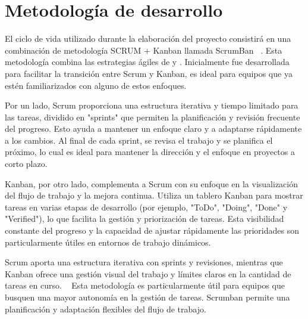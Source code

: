 \section{Metodología de desarrollo}
\label{sec:methodology}


El ciclo de vida utilizado durante la elaboración del proyecto consistirá en una combinación de metodología SCRUM + Kanban llamada ScrumBan ~\cite{Scrumban}. Esta metodología combina las estrategias ágiles de  y . Inicialmente fue desarrollada para facilitar la transición entre Scrum y Kanban, es ideal para equipos que ya estén familiarizados con alguno de estos enfoques. 

Por un lado, Scrum proporciona una estructura iterativa y tiempo limitado para las tareas, dividido en "sprints" que permiten la planificación y revisión frecuente del progreso. Esto ayuda a mantener un enfoque claro y a adaptarse rápidamente a los cambios. Al final de cada sprint, se revisa el trabajo y se planifica el próximo, lo cual es ideal para mantener la dirección y el enfoque en proyectos a corto plazo.

Kanban, por otro lado, complementa a Scrum con su enfoque en la visualización del flujo de trabajo y la mejora continua. Utiliza un tablero Kanban para mostrar tareas en varias etapas de desarrollo (por ejemplo, "ToDo", "Doing", "Done" y "Verified"), lo que facilita la gestión y priorización de tareas. Esta visibilidad constante del progreso y la capacidad de ajustar rápidamente las prioridades son particularmente útiles en entornos de trabajo dinámicos.

Scrum aporta una estructura iterativa con sprints y revisiones, mientras que Kanban ofrece una gestión visual del trabajo y límites claros en la cantidad de tareas en curso. ~\cite{guzmanScrumbanmetodologia}
Esta metodología es particularmente útil para equipos que busquen una mayor autonomía en la gestión de tareas. Scrumban permite una planificación y adaptación flexibles del flujo de trabajo. 
